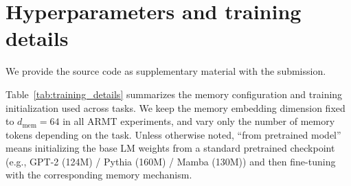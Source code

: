 \documentclass{article}
\theoremstyle{plain}
\theoremstyle{definition}
\theoremstyle{remark}
\begin{document}
{%



\section{Hyperparameters and training details}
\label{sec:training_details}

We provide the source code as supplementary material with the submission.

Table~\ref{tab:training_details} summarizes the memory configuration and training initialization used across tasks.
We keep the memory embedding dimension fixed to $d_{\text{mem}}=64$ in all ARMT experiments, and vary only the number of memory tokens depending on the task.
Unless otherwise noted, ``from pretrained model'' means initializing the base LM weights from a standard pretrained checkpoint (e.g., GPT-2 (124M) / Pythia (160M) / Mamba (130M)) and then fine-tuning with the corresponding memory mechanism.

}
\end{document}

